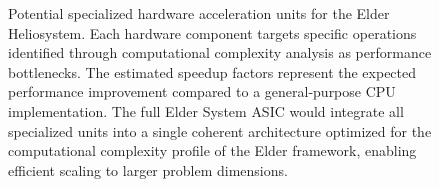 \begin{figure}[h]
\caption{Potential specialized hardware acceleration units for the Elder Heliosystem. Each hardware component targets specific operations identified through computational complexity analysis as performance bottlenecks. The estimated speedup factors represent the expected performance improvement compared to a general-purpose CPU implementation. The full Elder System ASIC would integrate all specialized units into a single coherent architecture optimized for the computational complexity profile of the Elder framework, enabling efficient scaling to larger problem dimensions.}
\label{fig:hardware_acceleration}
\end{figure}